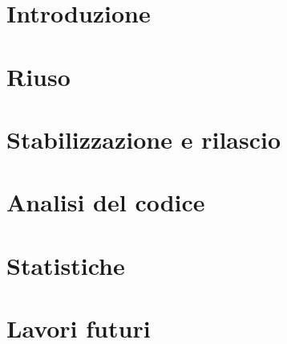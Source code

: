 
\section{Introduzione}

\section{Riuso}

\section{Stabilizzazione e rilascio}

\section{Analisi del codice}

\section{Statistiche}

\section{Lavori futuri}
